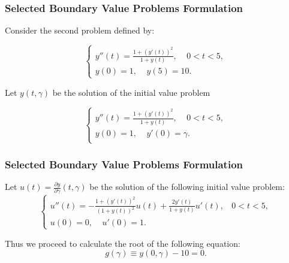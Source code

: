 \documentclass{beamer}
\begin{document}
\begin{frame}
\frametitle{Selected Boundary Value Problems Formulation} %
Consider the second problem defined by:

\begin{equation}\label{10}
    \begin{cases}
        y''(t)=\frac{1+(y'(t))^2}{1+y(t)}, \ \ \ \ \  0<t<5, \\
        y(0)=1, \ \ \ \ \ y(5)=10.
    \end{cases}
\end{equation} 

Let $y(t,\gamma)$ be the solution of the initial value problem

\begin{equation}\label{11}
    \begin{cases}
      y''(t)=\frac{1+(y'(t))^2}{1+y(t)}, \ \ \ \ \  0<t<5, \\
        y(0)=1, \ \ \ \ \ y'(0)=\gamma .\\
    \end{cases}
\end{equation}
    
\end{frame}

\begin{frame}
\frametitle{Selected Boundary Value Problems Formulation} %
Let $u(t)=\frac{\partial y}{\partial \gamma}(t, \gamma)$ be the solution of the following initial value problem:
    \begin{equation}\label{12}
        \begin{cases}
            u''(t)=-\frac{1+(y'(t))^2}{(1+y(t))^2}u(t)+\frac{2y'(t)}{1+y(t)}u'(t),\ \ \ \ 0 < t < 5, \\
            u(0)=0, \ \ \ \ \ u'(0)=1.
        \end{cases}
    \end{equation}
    
Thus we proceed to calculate the root of the following equation:
\begin{equation}\label{13}
g(\gamma)\equiv y(0,\gamma)-10=0.
\end{equation}
\end{frame}
\end{document}
